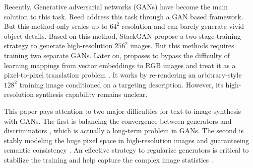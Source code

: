 \documentclass[10pt,twocolumn,letterpaper]{article}
\begin{document}
Recently, Generative adversarial networks (GANs) have become the main solution to this task. 
Reed \etal \cite{reed2016generative} address this task through a GAN based framework. But this method only scales up to $64^2$ resolution and can barely generate vivid object details.
Based on this method, StackGAN  \cite{han2017stackgan} propose a two-stage training strategy to generate high-resolution $256^2$ images. But this methods requires training two separate GANs.  Later on, \cite{dong2017semantic} proposes to bypass the difficulty of learning mappings from vector embeddings to RGB images and treat it as a pixel-to-pixel translation problem \cite{isola2016image}. It works by re-rendering an arbitrary-style $128^2$ training image conditioned on a targeting description. However, its high-resolution synthesis capability remains unclear. 

This paper pays attention to two major difficulties for text-to-image synthesis with GANs. The first is balancing the convergence between generators and discriminators \cite{goodfellow2014generative,improvedGAN}, which is actually a long-term problem in GANs. The second is stably modeling the huge pixel space in high-resolution images and guaranteeing semantic consistency \cite{han2017stackgan}. 
An effective strategy to regularize generators is critical to stabilize the training and help capture the complex image statistics \cite{huang2016stacked}. 
\end{document}
